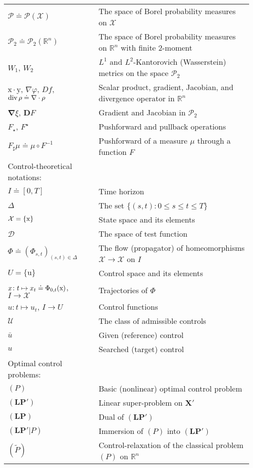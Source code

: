 \documentclass[sn-mathphys-num]{sn-jnl}
\DeclareRobustCommand{\nick}[1]{
\ifthenelse{\boolean{show_comments}}
{\begingroup\color{blue}{[\textbf{Nick:} #1]}\endgroup}
{}
}
\numberwithin{equation}{section}
\theoremstyle{mythm}
\theoremstyle{mydef}
\renewcommand{\phi}{\varphi}
\renewcommand{\div}{\mathop{\rm div}}
\renewcommand{\mathbf}[1]{\bm{#1}}
\newcommand{\R}{\mathbb{R}}
\begin{document}
\begin{longtable}[\textwidth]{l p{218pt}}
$\mathcal P \doteq \mathcal P(\mathcal X)$ & The space of Borel probability measures on $\mathcal X$\\
$\mathcal P_2 \doteq \mathcal P_2(\R^n)$ & The space of Borel probability measures on $\R^n$ with finite 2-moment\\
\( W_1 \), \(W_2\) & \( L^1 \) and \(L^2\)-Kantorovich (Wasserstein) metrics on the space $\mathcal P_2$ \\
$\mathrm x \cdot \mathrm y$, $\nabla \phi$, $Df$, $\div \rho \doteq \nabla \cdot \rho$ & Scalar product, gradient, Jacobian, and divergence operator in $\R^n$\\
$\bm \nabla \xi$, $\bm D F$ & Gradient and Jacobian in $\mathcal P_2$\\
$F_\star$, $F^\star$ & Pushforward and pullback operations %
\\
\( F_{\sharp}\mu \doteq \mu \circ F^{-1} \) & Pushforward of a measure \( \mu\) through a function \(F\)
\\[0.2cm]
Control-theoretical notations:\\[0.2cm]
$I \doteq [0,T]$ & Time horizon\\
$\Delta$ & The set $\{(s,t) : 0 \leq s \leq t \leq T\}$\\
$\mathcal X=\{{\rm x}\}$ & State space and its elements\\
$\bm{\mathcal D}$ & The space of test function\\
$\Phi \doteq (\Phi_{s,t})_{(s,t) \in \Delta}$ &  The flow (propagator) of homeomorphisms $\mathcal X \to \mathcal X$ on $I$\\
$U=\{\mathrm u\}$ &  Control space and its elements\\
$x\colon t \mapsto x_t \doteq \Phi_{0,t}({\rm x})$, $I \to \mathcal X$ & Trajectories of $\Phi$\\
$u\colon t \mapsto u_t$, $I \to U$ & Control functions\\
$\mathcal U$ & The class of admissible controls\\
$\bar u$ & Given (reference) control\\
$u$ 
& Searched (target) control\\[0.2cm]
Optimal control problems:\\[0.2cm]
 $(P)$ & Basic (nonlinear) optimal control problem  \\ 
$(\bm{LP}')$ & Linear super-problem on \( \mathbf{X}' \)\\  
$(\bm{LP})$ & Dual of $(\bm{LP}')$\\  
$(\bm{LP}'|P)$ & Immersion of $(P)$ into $(\bm{LP}')$\\
$(\widetilde P)$ & Control-relaxation of the classical problem  $(P)$ on $\R^n$
\end{longtable}
\end{document}
